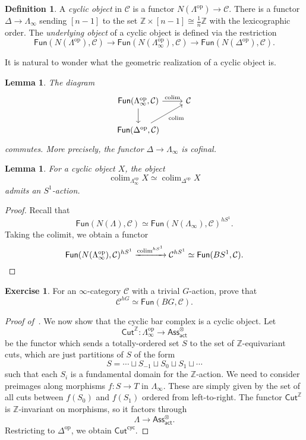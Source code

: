 \documentclass[10pt, oneside]{memoir}
\newtheorem{lem}[thm]{Lemma}
\theoremstyle{definition}
\newtheorem{defn}[thm]{Definition}
\newtheorem{exer}[thm]{Exercise}
\theoremstyle{remark}
\theoremstyle{plain}
\theoremstyle{definition}
\theoremstyle{remark}
\newcommand{\Z}{\mathbb{Z}}
\newcommand{\mc}[1]{\mathcal{#1}}
\newcommand{\ms}[1]{\mathsf{#1}}
\newcommand{\1}{\mathbf{1}}
\newcommand{\2}{\mathbf{2}}
\newcommand{\3}{\mathbf{3}}
\DeclareMathOperator{\op}{op}
\DeclareMathOperator*{\colim}{colim}
\begin{document}
\begin{defn}
    A \textit{cyclic object} in $\mc{C}$ is a functor $N(\Lambda^{\op}) \to \mc{C}$.
    There is a functor $\Delta \to \Lambda_{\infty}$ sending $[n-1]$ to the set $\Z \times [n-1] \cong \frac{1}{n} \Z$ with the lexicographic order. The \textit{underlying object} of a cyclic object is defined via the restriction
    \[ \ms{Fun}(N(\Lambda^{\op}), \mc{C}) \to \ms{Fun}(N(\Lambda_{\infty}^{\op}), \mc{C}) \to \ms{Fun}(N(\Delta^{\op}), \mc{C}). \]
\end{defn}

It is natural to wonder what the geometric realization of a cyclic object is.

\begin{lem}
    The diagram
    \begin{equation*}
    \begin{tikzcd}
        \ms{Fun}(\Lambda_{\infty}^{\op}, \mc{C}) \ar{r}{\colim} \ar{d} & \mc{C} \\
        \ms{Fun}(\Delta^{\op}, \mc{C}) \ar[swap]{ur}{\colim}
    \end{tikzcd}
    \end{equation*}
    commutes. More precisely, the functor $\Delta \to \Lambda_{\infty}$ is cofinal.
\end{lem}

\begin{lem}
    For a cyclic object $X$, the object
    \[ \colim_{\Lambda_{\infty}^{\op}} X \simeq \colim_{\Delta^{\op}} X \]
    admits an $S^1$-action.
\end{lem}

\begin{proof}
    Recall that
    \[ \ms{Fun}(N(\Lambda), \mc{C}) \simeq \ms{Fun}(N(\Lambda_{\infty}), \mc{C})^{hS^1}. \]
    Taking the colimit, we obtain a functor
    \[ \ms{Fun}(N(\Lambda_{\infty}^{\op}), \mc{C})^{h S^1} \xrightarrow{\colim^{hS^1}} \mc{C}^{hS^1} \simeq \ms{Fun}(BS^1, \mc{C}). \qedhere \]
\end{proof}

\begin{exer}
    For an $\infty$-category $\mc{C}$ with a trivial $G$-action, prove that
    \[ \mc{C}^{hG} \simeq \ms{Fun}(BG, \mc{C}). \]
\end{exer}


\begin{proof}[Proof of~]
    We now show that the cyclic bar complex is a cyclic object. Let
    \[ \ms{Cut}^{\Z} \colon \Lambda^{\op}_{\infty} \to \ms{Ass}_{\ms{act}}^{\otimes} \]
    be the functor which sends a totally-ordered set $S$ to the set of $\Z$-equivariant cuts, which are just partitions of $S$ of the form
    \[ S = \cdots \sqcup S_{-1} \sqcup S_0 \sqcup S_1 \sqcup \cdots \]
    such that each $S_i$ is a fundamental domain for the $\Z$-action. We need to consider preimages along morphisms $f \colon S \to T$ in $\Lambda_{\infty}$. These are simply given by the set of all cuts between $f(S_0)$ and $f(S_1)$ ordered from left-to-right. The functor $\ms{Cut}^{\Z}$ is $\Z$-invariant on morphisms, so it factors through
    \[ \Lambda \to \ms{Ass}_{\ms{act}}^{\otimes}. \]
    Restricting to $\Delta^{\op}$, we obtain $\ms{Cut}^{\ms{cyc}}$.
\end{proof}
\end{document}
